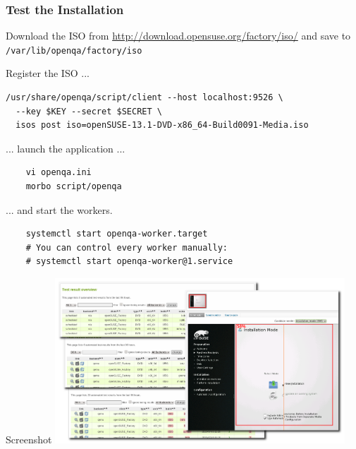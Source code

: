 \documentclass{beamer}
\begin{document}
%
%
\begin{frame}[fragile]
  \frametitle{Test the Installation}
  Download the ISO from
  \url{http://download.opensuse.org/factory/iso/}\newline
  and save to \texttt{/var/lib/openqa/factory/iso}

  Register the ISO ...
  \lstset{style=mybash}
  \begin{lstlisting}
/usr/share/openqa/script/client --host localhost:9526 \
  --key $KEY --secret $SECRET \
  isos post iso=openSUSE-13.1-DVD-x86_64-Build0091-Media.iso
  \end{lstlisting}

  ... launch the application ...
  \lstset{style=mybash}
  \begin{lstlisting}
    vi openqa.ini
    morbo script/openqa
  \end{lstlisting}

  ... and start the workers.
  \lstset{style=mybash}
  \begin{lstlisting}
    systemctl start openqa-worker.target
    # You can control every worker manually:
    # systemctl start openqa-worker@1.service
  \end{lstlisting}
\end{frame}

%
%
\begin{frame}{Screenshot}
  \includegraphics[height=6.2cm,width=10.88cm]{screenshot}
\end{frame}
\end{document}
